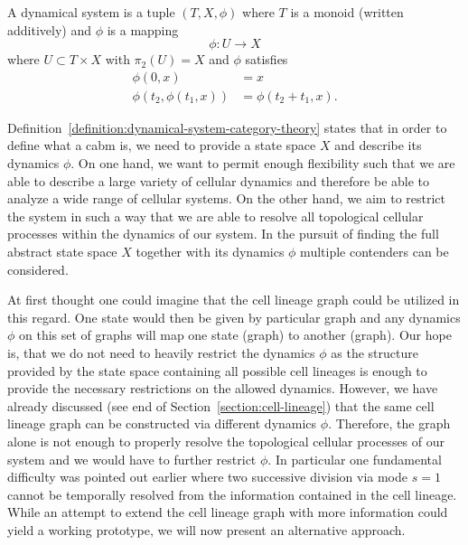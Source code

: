 \begin{definition}
    A dynamical system is a tuple $(T,X,\phi)$ where $T$ is a monoid (written additively) and
    $\phi$ is a mapping
    \begin{equation}
        \phi : U\rightarrow X
    \end{equation}
    where $U\subset T\times X$ with $\pi_2(U)=X$ and $\phi$ satisfies
    \begin{align}
        \phi(0,x) &= x
        \label{eq:dynamical-system-evolution-function-1}\\
        \phi(t_2, \phi(t_1, x)) &= \phi(t_2+t_1,x).
        \label{eq:dynamical-system-evolution-function-2}
    \end{align}
    \label{definition:dynamical-system-category-theory}
\end{definition}

Definition~\ref{definition:dynamical-system-category-theory} states that in order to define what a
\ac{cabm} is, we need to provide a state space $X$ and describe its dynamics $\phi$.
On one hand, we want to permit enough flexibility such that we are able to describe a large variety
of cellular dynamics and therefore be able to analyze a wide range of cellular systems.
On the other hand, we aim to restrict the system in such a way that we are able to resolve all
topological cellular processes within the dynamics of our system.
In the pursuit of finding the full abstract state space $X$ together with its dynamics $\phi$
multiple contenders can be considered.

At first thought one could imagine that the cell lineage graph could be utilized in this regard.
One state would then be given by particular graph and any dynamics $\phi$ on this set of graphs will
map one state (graph) to another (graph).
Our hope is, that we do not need to heavily restrict the dynamics $\phi$ as the structure provided
by the state space containing all possible cell lineages is enough to provide the necessary
restrictions on the allowed dynamics.
However, we have already discussed (see end of Section~\ref{section:cell-lineage}) that the same
cell lineage graph can be constructed via different dynamics $\phi$.
Therefore, the graph alone is not enough to properly resolve the topological cellular processes of
our system and we would have to further restrict $\phi$.
In particular one fundamental difficulty was pointed out earlier where two successive division via
mode $s=1$ cannot be temporally resolved from the information contained in the cell lineage.
While an attempt to extend the cell lineage graph with more information could yield a working
prototype, we will now present an alternative approach.

